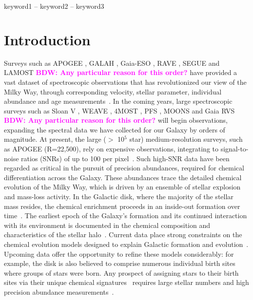 \documentclass[a4paper,fleqn,usenatbib]{mnras}
\newcommand{\bdw}[1]{\textbf{\textcolor{magenta}{BDW: #1}}}
\begin{document}
\begin{keywords}
keyword1 -- keyword2 -- keyword3
\end{keywords}


\section{Introduction}
\label{sec:intro}

Surveys such as APOGEE \citep{Majewski2017}, GALAH \citep{deSilva2015}, Gaia-ESO \citep{Gilmore2012}, RAVE \citep{Steinmetz2006}, SEGUE \citep{Yanny2009} and LAMOST \citep{Newberg2012} \bdw{Any particular reason for this order?} have provided a vast dataset of spectroscopic observations that has revolutionized our view of the Milky Way, through corresponding velocity, stellar parameter, individual abundance and age measurements~\citep[e.g.][]{Nidever2014,Minchev2014a,Hayden2015,Kord2015,Ho2017,Frankel2018,Bovy2019,Ted2019a,BH2019}. In the coming years, large spectroscopic surveys such as Sloan V \citep{Kollmeier2017}, WEAVE \citep{Bonifacio2016}, 4MOST \citep{deJong2016}, PFS \citep{PFS2016}, MOONS \citep{C2014} and Gaia RVS \citep{Gaia2016} \bdw{Any particular reason for this order?} will begin observations, expanding the spectral data we have collected for our Galaxy by orders of magnitude. At present, the large ($>$ 10$^5$ star) medium-resolution surveys, such as APOGEE (R=22,500), rely on expensive observations, integrating to signal-to-noise ratios (SNRs) of up to 100 per pixel~\citep{Zasowski2013,Zasowski2017}. Such high-SNR data have been regarded as critical in the pursuit of precision abundances, required for  chemical differentiation across the Galaxy.  These abundances trace the detailed chemical evolution of the Milky Way, which is driven by an ensemble of stellar explosion and mass-loss activity. In the Galactic disk, where the majority of the stellar mass resides, the chemical enrichment proceeds in an  inside-out formation over time~\citep{Rix2013,BH2016}. The earliest epoch of the Galaxy's formation and its continued interaction with its environment is documented in the chemical composition and characteristics of the stellar halo~\citep[e.g.][]{Keith2015,Payel2019, Helmi2018}.  Current data place strong constraints on the chemical evolution models designed to explain Galactic formation and evolution~\citep[e.g.][]{Minchev2013,Minchev2014b,Robyn2018, Weinberg2019, Clarke2019, Blancato2019}. Upcoming data offer the opportunity to refine these models considerably: for example, the disk is also believed to comprise  numerous individual birth sites where groups of stars were born. Any prospect of assigning stars to their birth sites via their unique chemical signatures~\citep[e.g.][]{BH2010} requires large stellar numbers and high precision abundance measurements~\citep{Mits2013, Ting2015, Hogg2016, Arm2018}. 
\end{document}
